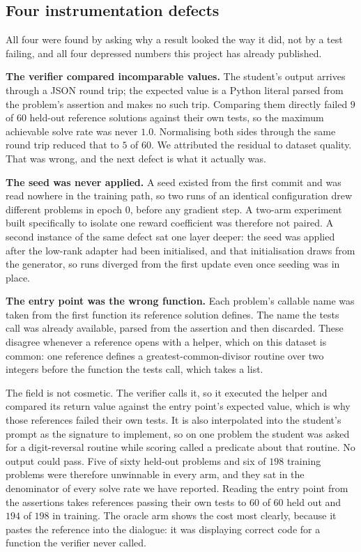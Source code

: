 \subsection{Four instrumentation defects}
\label{sec:instrument}

All four were found by asking why a result looked the way it did, not by a test
failing, and all four depressed numbers this project has already published.

\textbf{The verifier compared incomparable values.} The student's output arrives
through a JSON round trip; the expected value is a Python literal parsed from
the problem's assertion and makes no such trip. Comparing them directly failed
$9$ of $60$ held-out reference solutions against their own tests, so the maximum
achievable solve rate was never $1.0$. Normalising both sides through the same
round trip reduced that to $5$ of $60$. We attributed the residual to dataset
quality. That was wrong, and the next defect is what it actually was.

\textbf{The seed was never applied.} A seed existed from the first commit and
was read nowhere in the training path, so two runs of an identical
configuration drew different problems in epoch 0, before any gradient step. A
two-arm experiment built specifically to isolate one reward coefficient was
therefore not paired. A second instance of the same defect sat one layer deeper:
the seed was applied after the low-rank adapter had been initialised, and that
initialisation draws from the generator, so runs diverged from the first update
even once seeding was in place.

\textbf{The entry point was the wrong function.} Each problem's callable name
was taken from the first function its reference solution defines. The name the
tests call was already available, parsed from the assertion and then discarded.
These disagree whenever a reference opens with a helper, which on this dataset
is common: one reference defines a greatest-common-divisor routine over two
integers before the function the tests call, which takes a list.

The field is not cosmetic. The verifier calls it, so it executed the helper and
compared its return value against the entry point's expected value, which is why
those references failed their own tests. It is also interpolated into the
student's prompt as the signature to implement, so on one problem the student
was asked for a digit-reversal routine while scoring called a predicate about
that routine. No output could pass. Five of sixty held-out problems and six of
$198$ training problems were therefore unwinnable in every arm, and they sat in
the denominator of every solve rate we have reported. Reading the entry point
from the assertions takes references passing their own tests to $60$ of $60$
held out and $194$ of $198$ in training. The oracle arm shows the cost most
clearly, because it pastes the reference into the dialogue: it was displaying
correct code for a function the verifier never called.

